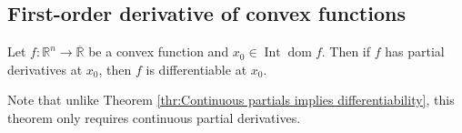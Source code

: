 
\subsection{First-order derivative of convex functions} %
\label{sub:First-order derivative of convex functions}

\begin{theorem}
\label{thr:Partials and convex implies differentiability}
  Let \( f: \mathbb{R}^{n} \to \overline{\mathbb{R}}  \) be a convex function
  and \( x_{0} \in \operatorname{Int} \operatorname{dom} f \). Then if \( f \)
  has partial derivatives at \( x_{0} \), then \( f \) is differentiable at \(
  x_{0} \).
\end{theorem}

Note that unlike Theorem \ref{thr:Continuous partials implies
differentiability}, this theorem only requires continuous partial derivatives.

